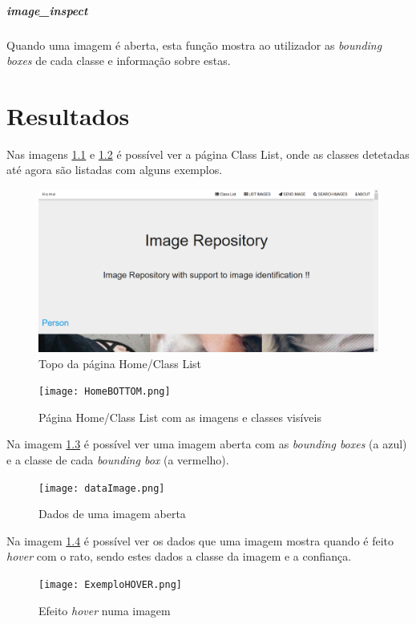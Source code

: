 \documentclass{report}
\begin{document}
\paragraph{image\_inspect} Quando uma imagem é aberta, esta função mostra ao utilizador as \textit{bounding boxes} de cada classe e informação sobre estas. 


\chapter{Resultados}
\label{chap.resultados}
Nas imagens \ref{Fig1} e \ref{Fig2} é possível ver a página Class List, onde as classes detetadas até agora são listadas com alguns exemplos. 

\begin{figure}[H]
\includegraphics[width=\textwidth]{HomeTOP.png}
\caption{Topo da página Home/Class List}
\label{Fig1}
\end{figure}

\begin{figure}[H]
\texttt{[image: HomeBOTTOM.png]}
\caption{Página Home/Class List com as imagens e classes visíveis}
\label{Fig2}
\end{figure}

Na imagem \ref{Fig3} é possível ver uma imagem aberta com as \textit{bounding boxes} (a azul) e a classe de cada \textit{bounding box} (a vermelho).

\begin{figure}[H]
\texttt{[image: dataImage.png]}
\caption{Dados de uma imagem aberta}
\label{Fig3}
\end{figure}

Na imagem \ref{Fig4} é possível ver os dados que uma imagem mostra quando é feito \textit{hover} com o rato, sendo estes dados a classe da imagem e a confiança.

\begin{figure}[H]
\texttt{[image: ExemploHOVER.png]}
\caption{Efeito \textit{hover} numa imagem}
\label{Fig4}
\end{figure}
\end{document}
